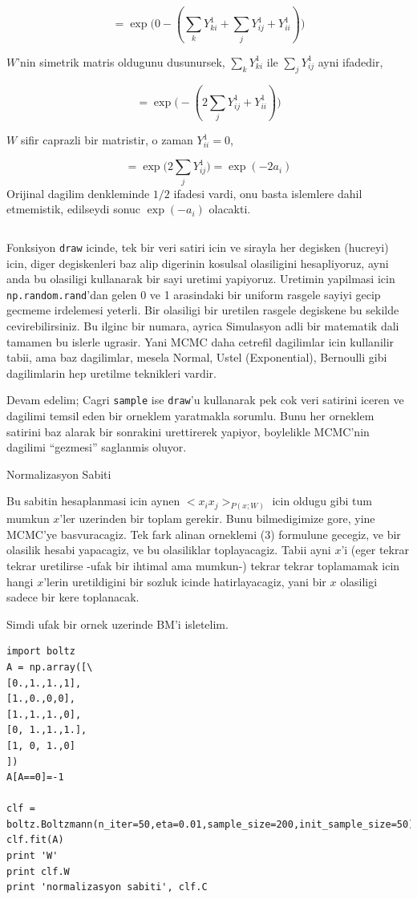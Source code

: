 \documentclass[12pt,fleqn]{article}\usepackage{../common}
\begin{document}
$$ 
= \exp \big( 
0 - ( \sum_{k}  Y_{ki}^1 + \sum_{j} Y_{ij}^1 + Y_{ii}^1  ) 
\big)
 $$

$W$'nin simetrik matris oldugunu dusunursek, $\sum_{k}  Y_{ki}^1$ ile $\sum_{j}Y_{ij}^1$ ayni ifadedir, 

$$ 
= \exp \big( 
- ( 2 \sum_{j} Y_{ij}^1 + Y_{ii}^1  ) 
\big)
 $$

$W$ sifir caprazli bir matristir, o zaman $Y_{ii}^1=0$, 

$$ 
= \exp \big( 2 \sum_{j} Y_{ij}^1 \big) = \exp (- 2 a_i )
 $$
Orijinal dagilim denkleminde $1/2$ ifadesi vardi, onu basta islemlere dahil
etmemistik, edilseydi sonuc  $\exp (- a_i)$ olacakti. 

\inputminted[fontsize=\footnotesize]{python}{boltz.py}

Fonksiyon \verb!draw! icinde, tek bir veri satiri icin ve sirayla her
degisken (hucreyi) icin, diger degiskenleri baz alip digerinin kosulsal
olasiligini hesapliyoruz, ayni anda bu olasiligi kullanarak bir sayi
uretimi yapiyoruz. Uretimin yapilmasi icin \verb!np.random.rand!'dan gelen
0 ve 1 arasindaki bir uniform rasgele sayiyi gecip gecmeme irdelemesi
yeterli. Bir olasiligi bir uretilen rasgele degiskene bu sekilde
cevirebilirsiniz. Bu ilginc bir numara, ayrica Simulasyon adli bir
matematik dali tamamen bu islerle ugrasir. Yani MCMC daha cetrefil
dagilimlar icin kullanilir tabii, ama baz dagilimlar, mesela Normal, Ustel
(Exponential), Bernoulli gibi dagilimlarin hep uretilme teknikleri vardir. 

Devam edelim; Cagri \verb!sample! ise \verb!draw!'u kullanarak pek cok veri
satirini iceren ve dagilimi temsil eden bir orneklem yaratmakla
sorumlu. Bunu her orneklem satirini baz alarak bir sonrakini urettirerek
yapiyor, boylelikle MCMC'nin dagilimi ``gezmesi'' saglanmis oluyor.

Normalizasyon Sabiti

Bu sabitin hesaplanmasi icin aynen $<x_ix_j>_{P(x;W)}$ icin oldugu gibi tum
mumkun $x$'ler uzerinden bir toplam gerekir. Bunu bilmedigimize gore, yine
MCMC'ye basvuracagiz. Tek fark alinan orneklemi (3) formulune gecegiz, ve
bir olasilik hesabi yapacagiz, ve bu olasiliklar toplayacagiz. Tabii ayni
$x$'i (eger tekrar tekrar uretilirse -ufak bir ihtimal ama mumkun-) tekrar
tekrar toplamamak icin hangi $x$'lerin uretildigini bir sozluk icinde
hatirlayacagiz, yani bir $x$ olasiligi sadece bir kere toplanacak. 

Simdi ufak bir ornek uzerinde BM'i isletelim. 

\begin{verbatim}
import boltz
A = np.array([\
[0.,1.,1.,1],
[1.,0.,0,0],
[1.,1.,1.,0],
[0, 1.,1.,1.],
[1, 0, 1.,0]
])
A[A==0]=-1

clf = boltz.Boltzmann(n_iter=50,eta=0.01,sample_size=200,init_sample_size=50)
clf.fit(A)
print 'W'
print clf.W
print 'normalizasyon sabiti', clf.C
\end{verbatim}
\end{document}
